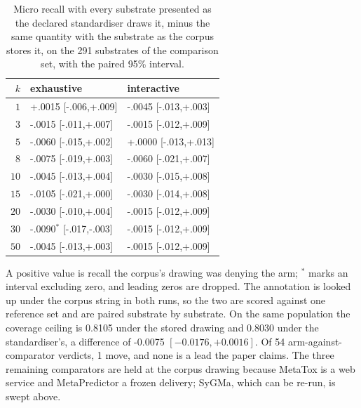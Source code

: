 \begin{table}[h]
\centering\small
\begin{threeparttable}
\caption{Micro recall with every substrate presented as the declared standardiser draws it, minus the same quantity with the substrate as the corpus stores it, on the 291 substrates of the comparison set, with the paired 95\% interval.}
\label{tab:si-dialect}
\begin{tabular}{rll}
\toprule
$k$ & exhaustive & interactive \\
\midrule
$1$ & +.0015\phantom{$^{*}$} {\scriptsize [-.006,+.009]} & -.0045\phantom{$^{*}$} {\scriptsize [-.013,+.003]} \\
$3$ & -.0015\phantom{$^{*}$} {\scriptsize [-.011,+.007]} & -.0015\phantom{$^{*}$} {\scriptsize [-.012,+.009]} \\
$5$ & -.0060\phantom{$^{*}$} {\scriptsize [-.015,+.002]} & +.0000\phantom{$^{*}$} {\scriptsize [-.013,+.013]} \\
$8$ & -.0075\phantom{$^{*}$} {\scriptsize [-.019,+.003]} & -.0060\phantom{$^{*}$} {\scriptsize [-.021,+.007]} \\
$10$ & -.0045\phantom{$^{*}$} {\scriptsize [-.013,+.004]} & -.0030\phantom{$^{*}$} {\scriptsize [-.015,+.008]} \\
$15$ & -.0105\phantom{$^{*}$} {\scriptsize [-.021,+.000]} & -.0030\phantom{$^{*}$} {\scriptsize [-.014,+.008]} \\
$20$ & -.0030\phantom{$^{*}$} {\scriptsize [-.010,+.004]} & -.0015\phantom{$^{*}$} {\scriptsize [-.012,+.009]} \\
$30$ & -.0090$^{*}$ {\scriptsize [-.017,-.003]} & -.0015\phantom{$^{*}$} {\scriptsize [-.012,+.009]} \\
$50$ & -.0045\phantom{$^{*}$} {\scriptsize [-.013,+.003]} & -.0015\phantom{$^{*}$} {\scriptsize [-.012,+.009]} \\
\bottomrule
\end{tabular}
\begin{tablenotes}[flushleft]\footnotesize
\item A positive value is recall the corpus's drawing was denying the arm; $^{*}$ marks an interval excluding zero, and leading zeros are dropped. The annotation is looked up under the corpus string in both runs, so the two are scored against one reference set and are paired substrate by substrate. On the same population the coverage ceiling is 0.8105 under the stored drawing and 0.8030 under the standardiser's, a difference of -0.0075 $[-0.0176, +0.0016]$. Of 54 arm-against-comparator verdicts, 1 move, and none is a lead the paper claims. The three remaining comparators are held at the corpus drawing because MetaTox is a web service and MetaPredictor a frozen delivery; SyGMa, which can be re-run, is swept above.
\end{tablenotes}
\end{threeparttable}
\end{table}
